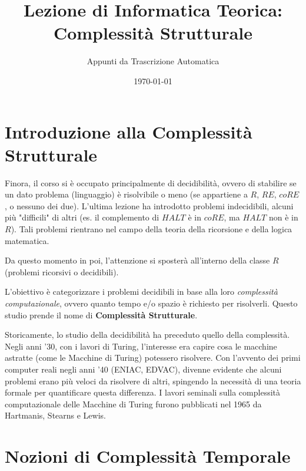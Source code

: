 \documentclass[a4paper]{article}
\title{Lezione di Informatica Teorica: Complessità Strutturale}
\author{Appunti da Trascrizione Automatica}
\date{\today}
\theoremstyle{definition} %
\begin{document}
\maketitle
\tableofcontents
\newpage

\section{Introduzione alla Complessità Strutturale}

Finora, il corso si è occupato principalmente di decidibilità, ovvero di stabilire se un dato problema (linguaggio) è risolvibile o meno (se appartiene a $R$, $RE$, $coRE$, o nessuno dei due).
L'ultima lezione ha introdotto problemi indecidibili, alcuni più "difficili" di altri (es. il complemento di $HALT$ è in $coRE$, ma $HALT$ non è in $R$). Tali problemi rientrano nel campo della teoria della ricorsione e della logica matematica.

Da questo momento in poi, l'attenzione si sposterà all'interno della classe $R$ (problemi ricorsivi o decidibili).
\begin{center}
\end{center}
L'obiettivo è categorizzare i problemi decidibili in base alla loro \emph{complessità computazionale}, ovvero quanto tempo e/o spazio è richiesto per risolverli. Questo studio prende il nome di \textbf{Complessità Strutturale}.

Storicamente, lo studio della decidibilità ha preceduto quello della complessità. Negli anni '30, con i lavori di Turing, l'interesse era capire cosa le macchine astratte (come le Macchine di Turing) potessero risolvere. Con l'avvento dei primi computer reali negli anni '40 (ENIAC, EDVAC), divenne evidente che alcuni problemi erano più veloci da risolvere di altri, spingendo la necessità di una teoria formale per quantificare questa differenza.
I lavori seminali sulla complessità computazionale delle Macchine di Turing furono pubblicati nel 1965 da Hartmanis, Stearns e Lewis.

\section{Nozioni di Complessità Temporale}
\end{document}
